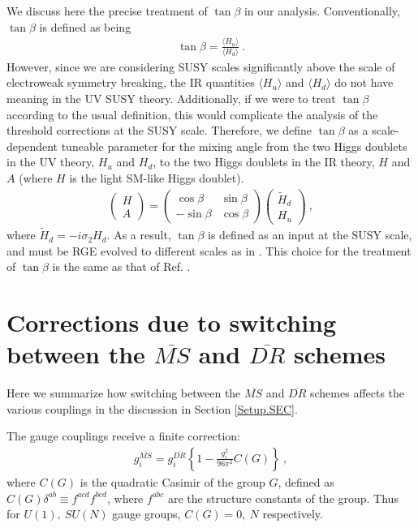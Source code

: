 \documentclass[12pt]{article}
\newcommand{\MS}{\overline{MS}}
\newcommand{\DR}{\overline{DR}}
\begin{document}
We discuss here the precise treatment of $\tan\beta$ in our analysis. Conventionally, $\tan\beta$ is defined as being
\begin{align}
 \tan\beta = \frac{\langle H_u \rangle}{\langle H_d \rangle}\ .
\end{align}
However, since we are considering SUSY scales significantly above the scale of electroweak symmetry breaking, the IR quantities $\langle H_u \rangle$ and $\langle H_d \rangle$ do not have meaning in the UV SUSY theory. Additionally, if we were to treat $\tan\beta$ according to the usual definition, this would complicate the analysis of the threshold corrections at the SUSY scale. Therefore, we define $\tan\beta$ as a scale-dependent tuneable parameter for the mixing angle from the two Higgs doublets in the UV theory, $H_u$ and $H_d$, to the two Higgs doublets in the IR theory, $H$ and $A$ (where $H$ is the light SM-like Higgs doublet).
\begin{align}
\begin{pmatrix} H \\ A \end{pmatrix} = \begin{pmatrix} \cos\beta & \sin\beta \\ -\sin\beta & \cos\beta \end{pmatrix} \begin{pmatrix} \tilde{H}_d \\ H_u \end{pmatrix} \ ,
\end{align}
where $\tilde{H}_d = -i \sigma_2 H_d$.
 As a result, $\tan\beta$ is defined as an input at the SUSY scale, and must be RGE evolved to different scales as in \cite{Sperling:2013eva}. This choice for the treatment of $\tan\beta$ is the same as that of Ref. \cite{Bagnaschi:2014rsa}.
 
\section{Corrections due to switching between the $\MS$ and $\DR$ schemes}
\label{Scheme.APP}

Here we summarize how switching between the $\MS$ and $\DR$ schemes affects the various couplings in the discussion in Section \ref{Setup.SEC}. 

The gauge couplings receive a finite correction:
\begin{align}
g_i^{\MS} = g_i^{\DR}\left\{ 1-\frac{g_i^2}{96\pi^2} C(G)\right\} \ ,
\end{align}
where $C(G)$ is the quadratic Casimir of the group $G$, defined as $C(G)\delta^{ab} \equiv f^{acd} f^{bcd}$, where $f^{abc}$ are the structure constants of the group. Thus for $U(1),~SU(N)$ gauge groups, $C(G) = 0,~N$ respectively.
\end{document}
